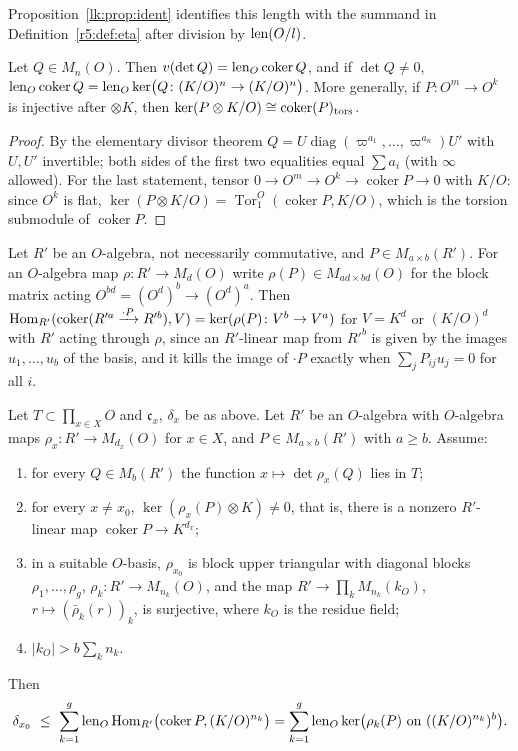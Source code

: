 Proposition~\ref{lk:prop:ident} identifies this length with the summand in Definition~\ref{r5:def:eta} after division by $\operatorname{len}(O/l)$.

\begin{lemma}\label{w4:lem:det}
Let $Q\in M_n(O)$. Then $v(\det Q)=\operatorname{len}_O\operatorname{coker}Q$, and if $\det Q\ne0$, $\operatorname{len}_O\operatorname{coker}Q=\operatorname{len}_O\ker\bigl(Q\colon(K/O)^n\to(K/O)^n\bigr)$. More generally, if $P\colon O^m\to O^k$ is injective after $\otimes K$, then $\ker(P\otimes K/O)\cong\operatorname{coker}(P)_{\rm tors}$.
\end{lemma}

\begin{proof}
By the elementary divisor theorem $Q=U\operatorname{diag}(\varpi^{a_1},\dots,\varpi^{a_n})U'$ with $U,U'$ invertible; both sides of the first two equalities equal $\sum a_i$ (with $\infty$ allowed). For the last statement, tensor $0\to O^m\to O^k\to\operatorname{coker}P\to0$ with $K/O$: since $O^k$ is flat, $\ker(P\otimes K/O)=\operatorname{Tor}_1^O(\operatorname{coker}P,K/O)$, which is the torsion submodule of $\operatorname{coker}P$.
\end{proof}

Let $R'$ be an $O$-algebra, not necessarily commutative, and $P\in M_{a\times b}(R')$. For an $O$-algebra map $\rho\colon R'\to M_d(O)$ write $\rho(P)\in M_{ad\times bd}(O)$ for the block matrix acting $O^{bd}=(O^d)^b\to(O^d)^a$. Then $\operatorname{Hom}_{R'}(\operatorname{coker}(R'^a\xrightarrow{\cdot P}R'^b),V)=\ker(\rho(P)\colon V^b\to V^a)$ for $V=K^d$ or $(K/O)^d$ with $R'$ acting through $\rho$, since an $R'$-linear map from $R'^b$ is given by the images $u_1,\dots,u_b$ of the basis, and it kills the image of $\cdot P$ exactly when $\sum_jP_{ij}u_j=0$ for all $i$.

\begin{proposition}\label{w4:prop:fitting}
Let $T\subset\prod_{x\in X}O$ and $\mathfrak c_x$, $\delta_x$ be as above. Let $R'$ be an $O$-algebra with $O$-algebra maps $\rho_x\colon R'\to M_{d_x}(O)$ for $x\in X$, and $P\in M_{a\times b}(R')$ with $a\ge b$. Assume:
\begin{enumerate}[leftmargin=*,label=(F\arabic*)]
\item for every $Q\in M_b(R')$ the function $x\mapsto\det\rho_x(Q)$ lies in $T$;
\item for every $x\ne x_0$, $\ker(\rho_x(P)\otimes K)\ne0$, that is, there is a nonzero $R'$-linear map $\operatorname{coker}P\to K^{d_x}$;
\item in a suitable $O$-basis, $\rho_{x_0}$ is block upper triangular with diagonal blocks $\rho_1,\dots,\rho_g$, $\rho_k\colon R'\to M_{n_k}(O)$, and the map $R'\to\prod_kM_{n_k}(k_O)$, $r\mapsto(\bar\rho_k(r))_k$, is surjective, where $k_O$ is the residue field;
\item $\lvert k_O\rvert>b\sum_kn_k$.
\end{enumerate}
Then
\[
\delta_{x_0}\ \le\ \sum_{k=1}^g\len_O\Hom_{R'}\bigl(\operatorname{coker}P,(K/O)^{n_k}\bigr)=\sum_{k=1}^g\len_O\ker\bigl(\rho_k(P)\ \text{on}\ ((K/O)^{n_k})^b\bigr).
\]
\end{proposition}


